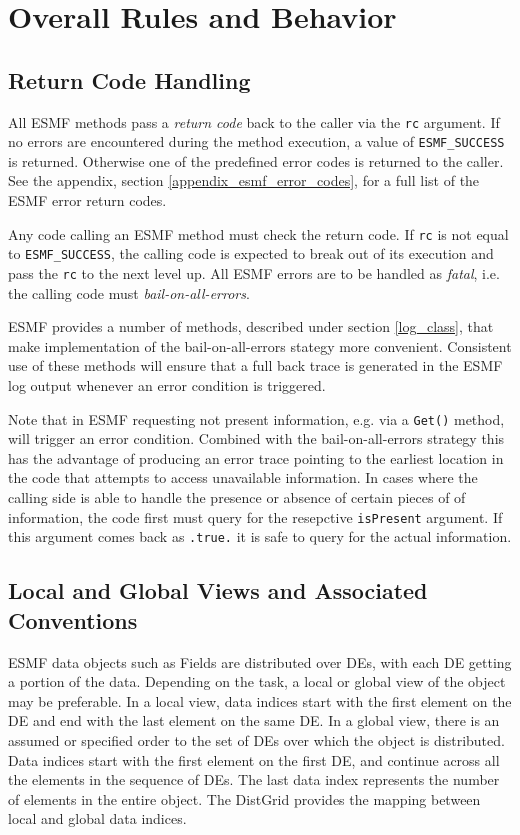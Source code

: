 \section{Overall Rules and Behavior}

\subsection{Return Code Handling}

All ESMF methods pass a {\em return code} back to the caller via the {\tt rc}
argument. If no errors are encountered during the method execution, a
value of {\tt ESMF\_SUCCESS} is returned. Otherwise one of the predefined
error codes is returned to the caller. See the appendix, section 
\ref{appendix_esmf_error_codes}, for a full list of the ESMF error return codes.

Any code calling an ESMF method must check the return code. If {\tt rc} is not
equal to {\tt ESMF\_SUCCESS}, the calling code is expected to break out of its
execution and pass the {\tt rc} to the next level up. All ESMF errors are to be
handled as {\em fatal}, i.e. the calling code must {\em bail-on-all-errors}.

ESMF provides a number of methods, described under section \ref{log_class},
that make implementation of the bail-on-all-errors stategy more convenient.
Consistent use of these methods will ensure that a full back trace is generated
in the ESMF log output whenever an error condition is triggered.

Note that in ESMF requesting not present information, e.g. via a {\tt Get()}
method, will trigger an error condition. Combined with the bail-on-all-errors
strategy this has the advantage of producing an error trace pointing to the
earliest location in the code that attempts to access unavailable information.
In cases where the calling side is able to handle the presence or absence of
certain pieces of of information, the code first must query for the resepctive
{\tt isPresent} argument. If this argument comes back as {\tt .true.} it is
safe to query for the actual information.

\subsection{Local and Global Views and Associated Conventions}

ESMF data objects such as Fields are distributed over
DEs, with each DE getting a portion of the data.  Depending
on the task, a local or global view of the object may be
preferable.  In a local view, data indices start with the first
element on the DE and end with the last element on the same DE.
In a global view, there is an assumed or specified order to
the set of DEs over which the object is distributed.  Data
indices start with the first element on the first DE, and
continue across all the elements in the sequence of DEs.
The last data index represents the number of elements in the
entire object.  The DistGrid provides the mapping between
local and global data indices.

